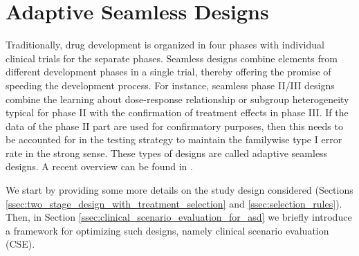 \documentclass[bimj,fleqn]{w-art}
\theoremstyle{plain}
\theoremstyle{definition}
\begin{document}



\section{Adaptive Seamless Designs}
\label{sec:adaptive_seamless_designs}

Traditionally, drug development is organized in four phases with individual clinical trials for the separate phases. Seamless designs combine elements from different development phases in a single trial, thereby offering the promise of speeding the development process. For instance, seamless phase II/III designs combine the learning about dose-response relationship or subgroup heterogeneity typical for phase II with the confirmation of treatment effects in phase III. If the data of the phase II part are used for confirmatory purposes, then this needs to be accounted for in the testing strategy to maintain the familywise type I error rate in the strong sense. These types of designs are called adaptive seamless designs. A recent overview can be found in \citet{friede_adaptive_2020}.

We start by providing some more details on the study design considered (Sections \ref{ssec:two_stage_design_with_treatment_selection} and \ref{ssec:selection_rules}). Then, in Section \ref{ssec:clinical_scenario_evaluation_for_asd} we briefly introduce a framework for optimizing such designs, namely clinical scenario evaluation (CSE). %
\end{document}
